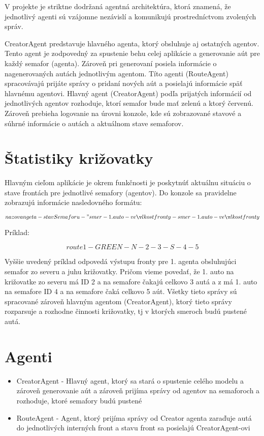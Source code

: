 \documentclass[12pt,a4paper,titlepage,final]{article}
\begin{document}
V projekte je striktne dodržaná agentná architektúra, ktorá znamená, že jednotlivý agenti sú vzájomne nezávislí a komunikujú prostredníctvom zvolených správ.

CreatorAgent predstavuje hlavného agenta, ktorý obsluhuje aj ostatných agentov. Tento agent je zodpovedný za spustenie behu celej aplikácie a generovanie aút pre každý semafor (agenta). Zároveň pri generovaní posiela informácie o nagenerovaných autách jednotlivým agentom. Títo agenti (RouteAgent) spracovávajú prijáte správy o pridaní nových aút a posielajú informácie späť hlavnému agentovi. Hlavný agent (CreatorAgent) podľa prijatých informácií od jednotlivých agentov rozhoduje, ktorí semafor bude mať zelenú a ktorý červenú. Zároveň prebieha logovanie na úrovni konzole, kde sú zobrazované stavové a súhrné informácie o autách a aktuálnom stave semaforov.

\newpage
\section{Štatistiky križovatky}
Hlavným cieľom aplikácie je okrem funkčnosti je poskytnúť aktuálnu situáciu o stave frontách pre jednotlivé semafory (agentov). Do konzole sa pravidelne zobrazujú informácie nasledovného formátu: 

\begin{equation} 
  nazovangeta-stavSemaforu-"smer-1.auto-veľkost fronty-smer-1.auto-veľkost fronty
\end{equation}

Príklad:

\begin{equation} 
  route1-GREEN-N-2-3-S-4-5
\end{equation}

Vyššie uvedený príklad odpovedá výstupu fronty pre 1. agenta obsluhujúci semafor zo severu a juhu križovatky. Pričom vieme povedať, že 1. auto na križovatke zo severu má ID 2 a na semafore čakajú celkovo 3 autá a z má 1. auto na semafore ID 4 a na semafore čaká celkovo 5 aút. Všetky tieto správy sú spracované zároveň hlavným agentom (CreatorAgent), ktorý tieto správy rozparsuje a rozhodne činnosti križovatky, tj v ktorých smeroch budú pustené autá.

\section{Agenti}
\begin{itemize}
\item CreatorAgent - Hlavný agent, ktorý sa stará o spustenie celého modelu a zároveň generovanie aút a zároveň prijíma správy od agentov na semaforoch a rozhoduje, ktoré semafory budú pustené
\item RouteAgent - Agent, ktorý prijíma správy od Creator agenta zaraďuje autá do jednotlivých interných front a stavu front sa posielajú CreatorAgent-ovi
\end{itemize}
\end{document}
